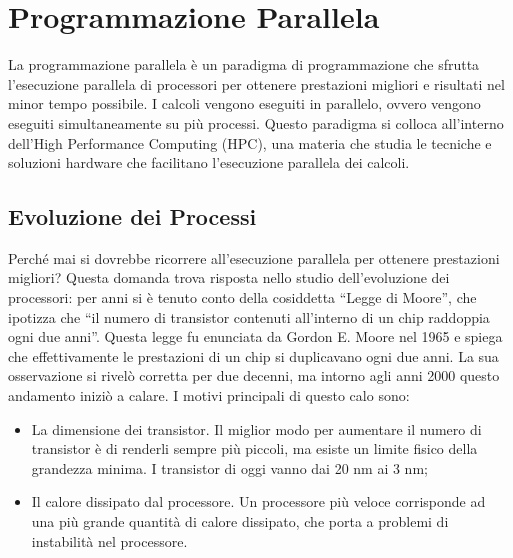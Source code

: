 \documentclass[12pt,a4paper,openright,twoside]{report}
\begin{document}
\rhead[\fancyplain{}{\bfseries\leftmark}]{\fancyplain{}{\bfseries\thepage}}
\clearpage{\pagestyle{empty}\cleardoublepage}
\clearpage{\pagestyle{empty}\cleardoublepage}
\chapter{Programmazione Parallela}

\lhead[\fancyplain{}{\bfseries\thepage}]{\fancyplain{}{\bfseries\rightmark}}

La programmazione parallela è un paradigma di programmazione che sfrutta l'esecuzione parallela di processori per ottenere prestazioni migliori e risultati nel minor tempo possibile. I calcoli vengono eseguiti in parallelo, ovvero vengono eseguiti simultaneamente su più processi. Questo paradigma si colloca all'interno dell'High Performance Computing (HPC), una materia che studia le tecniche e soluzioni hardware che facilitano l'esecuzione parallela dei calcoli.



\section{Evoluzione dei Processi}

Perché mai si dovrebbe ricorrere all'esecuzione parallela per ottenere prestazioni migliori? Questa domanda trova risposta nello studio dell'evoluzione dei processori: per anni si è tenuto conto della cosiddetta ``Legge di Moore'', che ipotizza che ``il numero di transistor contenuti all'interno di un chip raddoppia ogni due anni''. Questa legge fu enunciata da Gordon E. Moore nel 1965 e spiega che effettivamente le prestazioni di un chip si duplicavano ogni due anni. La sua osservazione si rivelò corretta per due decenni, ma intorno agli anni 2000 questo andamento iniziò a calare. I motivi principali di questo calo sono:

\begin{itemize}
    \item La dimensione dei transistor. Il miglior modo per aumentare il numero di transistor è di renderli sempre più piccoli, ma esiste un limite fisico della grandezza minima. I transistor di oggi vanno dai 20 nm ai 3 nm;
    \item Il calore dissipato dal processore. Un processore più veloce corrisponde ad una più grande quantità di calore dissipato, che porta a problemi di instabilità nel processore.
\end{itemize}
\end{document}
